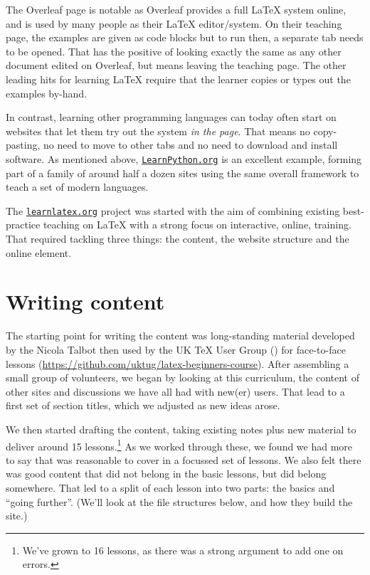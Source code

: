 \documentclass[harvardcite]{ltugboat}
\begin{document}
The Overleaf page is notable as Overleaf provides a full \LaTeX{} system
online, and is used by many people as their \LaTeX{} editor/system. On their
teaching page, the examples are given as code blocks but to run then, a
separate tab needs to be opened. That has the positive of looking exactly the
same as any other document edited on Overleaf, but means leaving the teaching
page. The other leading hits for learning \LaTeX{} require that the learner
copies or types out the examples by-hand.

In contrast, learning other programming languages can today often start on
websites that let them try out the system \emph{in the page}. That means
no copy-pasting, no need to move to other tabs and no need to download and
install software. As mentioned above, \href{https://LearnPython.org}{\nolinkurl{LearnPython.org}} is an excellent
example, forming part of a family of around half a dozen sites using the
same overall framework to teach a set of modern languages.

The \href{https://learnlatex.org}{\nolinkurl{learnlatex.org}} project was started with the aim of combining existing
best-practice teaching on \LaTeX{} with a strong focus on interactive, online,
training. That required tackling three things: the content, the website
structure and the online element.

\section{Writing content}

The starting point for writing the content was long-standing material developed
by the Nicola Talbot then used by the UK \TeX{} User Group () for
face-to-face lessons (\url{https://github.com/uktug/latex-beginners-course}). After 
assembling a small group of volunteers, we began by looking at this curriculum,
the content of other sites and discussions we have all had with new(er) users.
That lead to a first set of section titles, which we adjusted as new ideas
arose.

We then started drafting the content, taking existing notes plus new material
to deliver around 15 lessons.\footnote{We've grown to 16 lessons, as there was
a strong argument to add one on errors.} As we worked through these, we found
we had more to say that was reasonable to cover in a focussed set of lessons.
We also felt there was good content that did not belong in the basic lessons,
but did belong somewhere. That led to a split of each lesson into two parts:
the basics and \enquote{going further}. (We'll look at the file structures
below, and how they build the site.)
\end{document}
